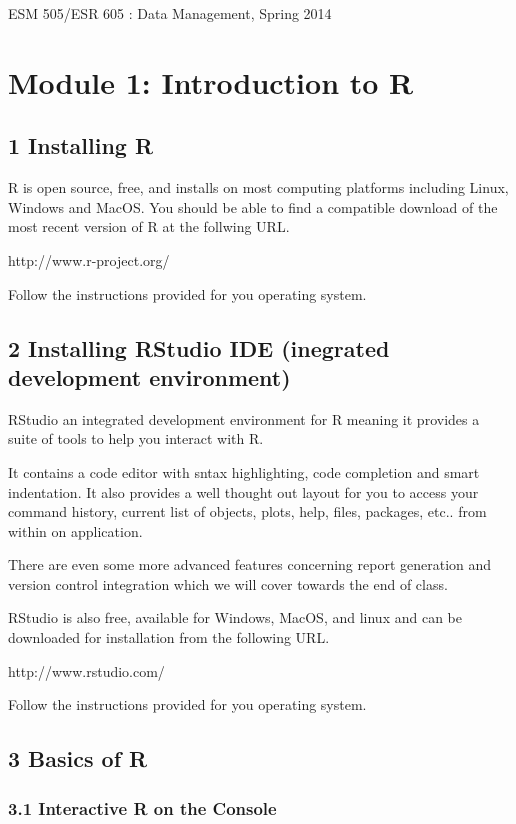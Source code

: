 \documentclass[]{article}
\author{}
\date{}
\begin{document}
ESM 505/ESR 605 : Data Management, Spring 2014

\section{Module 1: Introduction to R}

\subsection{1 Installing R}

R is open source, free, and installs on most computing platforms
including Linux, Windows and MacOS. You should be able to find a
compatible download of the most recent version of R at the follwing URL.

http://www.r-project.org/

Follow the instructions provided for you operating system.

\subsection{2 Installing RStudio IDE (inegrated development
environment)}

RStudio an integrated development environment for R meaning it provides
a suite of tools to help you interact with R.

It contains a code editor with sntax highlighting, code completion and
smart indentation. It also provides a well thought out layout for you to
access your command history, current list of objects, plots, help,
files, packages, etc.. from within on application.

There are even some more advanced features concerning report generation
and version control integration which we will cover towards the end of
class.

RStudio is also free, available for Windows, MacOS, and linux and can be
downloaded for installation from the following URL.

http://www.rstudio.com/

Follow the instructions provided for you operating system.

\subsection{3 Basics of R}

\subsubsection{3.1 Interactive R on the Console}
\end{document}
